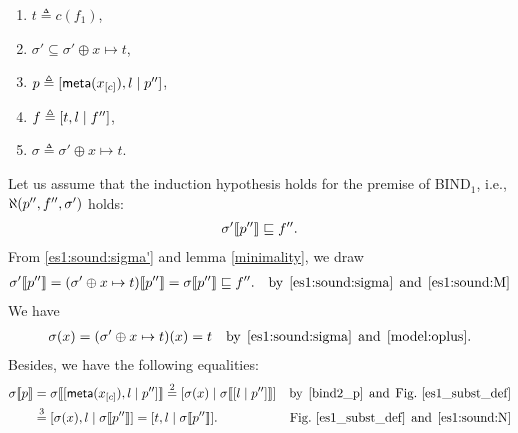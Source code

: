 \begin{enumerate}
\begin{enumerate}
        \item \(t \triangleq c(f_1)\),

        \item \label{es1:sound:sigma'} \(\sigma' \subseteq \sigma'
          \oplus x \mapsto t\),

        \item \label{bind2_p} \(p \triangleq
          \cons{\meta{x_{[c]}}, l}{p''}\),

        \item \label{es1:sound:1} \(f \triangleq \cons{t, l}{f''}\),


         \item \label{es1:sound:sigma} \(\sigma \triangleq \sigma'
           \oplus x \mapsto t\).

      \end{enumerate}
      Let us assume that the induction hypothesis holds for the
      premise of \textsf{BIND}\(_1\), i.e., 
      \(\ind{U}(p'', f'', \sigma')\) holds:
      \begin{gather}
        \subst{p''}{\sigma'} \sqsubseteq f''. \label{es1:sound:M}
      \end{gather}
      From \ref{es1:sound:sigma'} and lemma \ref{minimality}, we draw
      \begin{align}
           \subst{p''}{\sigma'} 
        &= \subst{p''}{(\sigma' \oplus x \mapsto
             t)} = \subst{p''}{\sigma} \sqsubseteq f''.
        &\text{by} \,\; \text{\ref{es1:sound:sigma}} \,\; \text{and}
           \,\; \eqref{es1:sound:M}\label{es1:sound:00}
      \end{align}
      We have
      \begin{align}
           \sigma(x) 
        &= (\sigma' \oplus x \mapsto t)(x) =  t
        &\text{by} \,\; \text{\ref{es1:sound:sigma}} \,\; \text{and}
           \,\; \eqref{model:oplus}\label{es1:sound:N}. 
      \end{align}
      Besides, we have the following equalities:
      \begin{align}
          \subst{p}{\sigma} 
        &= \subst{\cons{\meta{x_{[c]}},l}{p''}}{\sigma}\notag
          \eqn{2} \cons{\sigma(x)}{\subst{\cons{l}{p''}}{\sigma}}
        &\text{by} \,\; \text{\ref{bind2_p}} \,\; \text{and} \,\;
        \text{Fig.~\ref{es1_subst_def}}\notag\\
        &\eqn{3} \cons{\sigma(x),l}{\subst{p''}{\sigma}}
        = \cons{t,l}{\subst{p''}{\sigma}}.
        &\text{Fig.~\ref{es1_subst_def}} \,\; \text{and} \,\;
        \eqref{es1:sound:N}\label{es1:sound:13}

\end{align}
\end{enumerate}
